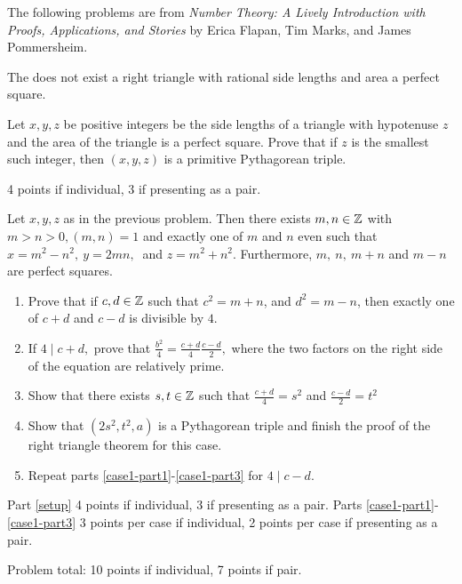 \documentclass[letterpaper, 11 pt]{ximera}
\begin{document}
\begin{exploration}
The following problems are from \emph{Number Theory: A Lively Introduction with Proofs, Applications, and Stories} by Erica Flapan, Tim Marks, and James Pommersheim.

\begin{theorem}
The does not exist a right triangle with rational side lengths and area a perfect square.
\end{theorem}

\begin{problem}
 	Let $x,y,z$ be positive integers be the side lengths of a triangle with hypotenuse $z$ and the area of the triangle is a perfect square.  Prove that if $z$ is the smallest such integer, then $(x,y,z)$ is a primitive Pythagorean triple.
	
\begin{rubric}
 4 points if individual, 3 if presenting as a pair.
\end{rubric}
\end{problem}

\begin{problem}
	Let $x,y,z$ as in the previous problem. Then there exists $m, n\in\mathbb Z$ with $m>n>0, (m,n)=1$ and exactly one of $m$ and $n$ even such that $x=m^2-n^2,\ y=2mn,\ $ and $z=m^2+n^2$. Furthermore, $m,\ n,\ m+n$ and $m-n$ are perfect squares. 
	
	\begin{enumerate}
		\item\label{setup}  Prove that if $c,d\in\mathbb Z$ such that $c^2=m+n$, and $d^2=m-n$, then exactly one of $c+d$ and $c-d$ is divisible by $4$.
		
		\item\label{case1-part1} If $4\mid c+d,$ prove that $\frac{b^2}{4}=\frac{c+d}{4}\frac{c-d}{2},$ where the two factors on the right side of the equation are relatively prime. 
		
		\item Show that there exists $s,t\in\mathbb Z$ such that $\frac{c+d}{4}=s^2$ and $\frac{c-d}{2}=t^2$ 
		
		\item\label{case1-part3} Show that $(2s^2,t^2,a)$ is a Pythagorean triple and finish the proof of the right triangle theorem for this case. 
		
		\item Repeat parts \ref{case1-part1}-\ref{case1-part3} for $4\mid c-d.$ 
	\end{enumerate}
\begin{rubric}
 Part \ref{setup} 4 points if individual, 3 if presenting as a pair.  Parts \ref{case1-part1}-\ref{case1-part3} 3 points per case if individual, 2 points per case if presenting as a pair.
 
 Problem total: 10 points if individual, 7 points if pair.
\end{rubric}
\end{problem}
\end{exploration}
\end{document}
